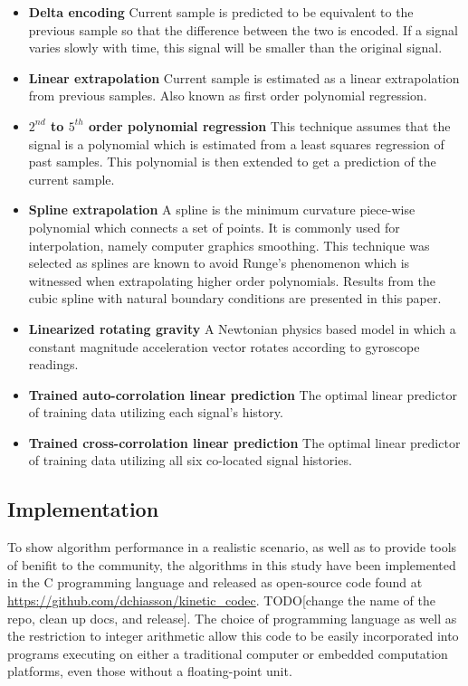 \documentclass[journal]{IEEEtran}
\begin{document}
\begin{itemize}
  \item \textbf{Delta encoding} Current sample is predicted to be equivalent to the previous sample so that the difference between the two is encoded. If a signal varies slowly with time, this signal will be smaller than the original signal.
  \item \textbf{Linear extrapolation} Current sample is estimated as a linear extrapolation from previous samples. Also known as first order polynomial regression.
  \item \textbf{\boldmath$2^{nd}$ to \boldmath$5^{th}$ order polynomial regression} This technique assumes that the signal is a polynomial which is estimated from a least squares regression of past samples. This polynomial is then extended to get a prediction of the current sample.
  \item \textbf{Spline extrapolation} A spline is the minimum curvature piece-wise polynomial which connects a set of points. It is commonly used for interpolation, namely computer graphics smoothing. This technique was selected as splines are known to avoid Runge's phenomenon which is witnessed when extrapolating higher order polynomials. Results from the cubic spline with natural boundary conditions are presented in this paper.
  \item \textbf{Linearized rotating gravity} A Newtonian physics based model in which a constant magnitude acceleration vector rotates according to gyroscope readings.
  \item \textbf{Trained auto-corrolation linear prediction} The optimal linear predictor of training data utilizing each signal's history.
   \item \textbf{Trained cross-corrolation linear prediction} The optimal linear predictor of training data utilizing all six co-located signal histories.
\end{itemize}

\subsection{Implementation}


To show algorithm performance in a realistic scenario, as well as to provide tools of benifit to the community, the algorithms in this study have been implemented in the C programming language and released as open-source code found at \url{https://github.com/dchiasson/kinetic_codec}. TODO[change the name of the repo, clean up docs, and release]. The choice of programming language as well as the restriction to integer arithmetic allow this code to be easily incorporated into programs executing on either a traditional computer or embedded computation platforms, even those without a floating-point unit.
\end{document}
